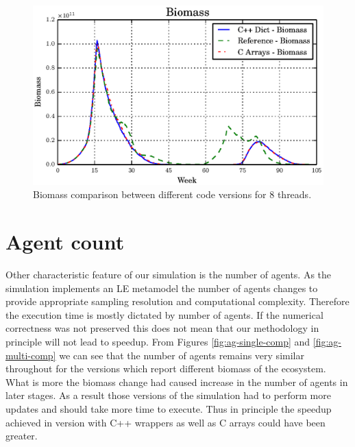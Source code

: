 \documentclass[12pt, a4paper]{report}
\begin{document}
\begin{figure}[H]
  \begin{center}
    \includegraphics[width=\columnwidth]{graphs/bio-multi-comp.eps}
    \caption{Biomass comparison between different code versions for 8 threads.}
    \label{fig:bio-multi-comp}
  \end{center}
\end{figure}

\section{Agent count}\label{subsec:model-correct-agent}
Other characteristic feature of our simulation is the number of agents. As the
simulation implements an LE metamodel the number of agents changes to provide
appropriate sampling resolution and computational complexity. Therefore the
execution time is mostly dictated by number of agents. If the numerical
correctness was not preserved this does not mean that our methodology in
principle will not lead to speedup. From Figures \ref{fig:ag-single-comp} and
\ref{fig:ag-multi-comp} we can see that the number of agents remains very
similar throughout for the versions which report different biomass of the
ecosystem. What is more the biomass change had caused increase in the number
of agents in later stages. As a result those versions of the simulation had
to perform more updates and should take more time to execute. Thus in principle
the speedup achieved in version with C++ wrappers as well as C arrays could have
been greater.
\end{document}

